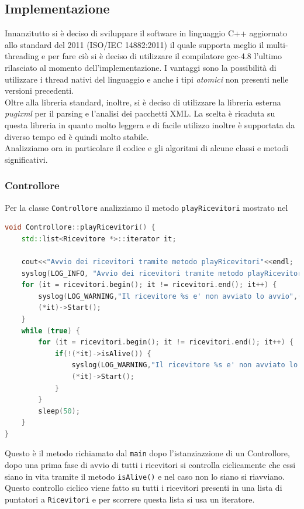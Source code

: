 \subsection{Implementazione}
Innanzitutto si è deciso di sviluppare il software in linguaggio C++ aggiornato allo standard del 2011 (ISO/IEC 14882:2011\cite{c++11}) il quale supporta meglio il multi-threading e per fare ciò si è deciso di utilizzare il compilatore gcc-4.8 l'ultimo rilasciato al momento dell'implementazione. I vantaggi sono la possibilità di utilizzare i thread nativi del linguaggio e anche i tipi \emph{atomici} non presenti nelle versioni precedenti.\\
Oltre alla libreria standard, inoltre, si è deciso di utilizzare la libreria esterna \emph{pugixml}\cite{pugi} per il parsing e l'analisi dei pacchetti XML. La scelta è ricaduta su questa libreria in quanto molto leggera e di facile utilizzo inoltre è supportata da diverso tempo ed è quindi molto stabile.\\
Analizziamo ora in particolare il codice e gli algoritmi di alcune classi e metodi significativi.
\subsubsection{Controllore}
Per la classe \texttt{Controllore} analizziamo il metodo \texttt{playRicevitori} mostrato nel 
\begin{lstlisting}[language=C++,caption=Metodo playRicevitori,label=lst:playriccode]
void Controllore::playRicevitori() {
    std::list<Ricevitore *>::iterator it;

    cout<<"Avvio dei ricevitori tramite metodo playRicevitori"<<endl;
    syslog(LOG_INFO, "Avvio dei ricevitori tramite metodo playRicevitori");
    for (it = ricevitori.begin(); it != ricevitori.end(); it++) {
        syslog(LOG_WARNING,"Il ricevitore %s e' non avviato lo avvio",(*it)->getNome());
        (*it)->Start();
    }
    while (true) {
        for (it = ricevitori.begin(); it != ricevitori.end(); it++) {
            if(!(*it)->isAlive()) {
                syslog(LOG_WARNING,"Il ricevitore %s e' non avviato lo avvio",(*it)->getNome());
                (*it)->Start();
            }
        }
        sleep(50);
    }
}
\end{lstlisting}
Questo è il metodo richiamato dal \texttt{main} dopo l'istanziazzione di un Controllore, dopo una prima fase di avvio di tutti i ricevitori si controlla ciclicamente che essi siano in vita tramite il metodo \texttt{isAlive()} e nel caso non lo siano si riavviano. Questo controllo ciclico viene fatto su tutti i ricevitori presenti in una lista di puntatori a \texttt{Ricevitori} e per scorrere questa lista si usa un iteratore.
